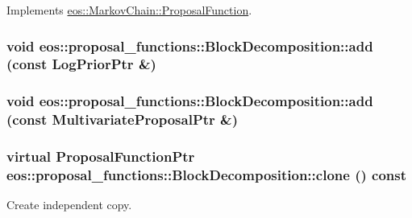 Implements \hyperlink{structeos_1_1MarkovChain_1_1ProposalFunction_afee6a937c53b9cfb257a5cd724a54296}{eos::MarkovChain::ProposalFunction}.\hypertarget{classeos_1_1proposal__functions_1_1BlockDecomposition_a0842f09231586dcf8fccd41e20f1198f}{
\subsubsection[{add}]{\setlength{\rightskip}{0pt plus 5cm}void eos::proposal\_\-functions::BlockDecomposition::add (const {\bf LogPriorPtr} \&)}}
\label{classeos_1_1proposal__functions_1_1BlockDecomposition_a0842f09231586dcf8fccd41e20f1198f}
\hypertarget{classeos_1_1proposal__functions_1_1BlockDecomposition_aa162a93e808bd848cbf5e761eb83ca68}{
\subsubsection[{add}]{\setlength{\rightskip}{0pt plus 5cm}void eos::proposal\_\-functions::BlockDecomposition::add (const {\bf MultivariateProposalPtr} \&)}}
\label{classeos_1_1proposal__functions_1_1BlockDecomposition_aa162a93e808bd848cbf5e761eb83ca68}
\hypertarget{classeos_1_1proposal__functions_1_1BlockDecomposition_ac863a3b2df66507f62c8decc7f543653}{
\subsubsection[{clone}]{\setlength{\rightskip}{0pt plus 5cm}virtual {\bf ProposalFunctionPtr} eos::proposal\_\-functions::BlockDecomposition::clone () const}}
\label{classeos_1_1proposal__functions_1_1BlockDecomposition_ac863a3b2df66507f62c8decc7f543653}


Create independent copy. 

